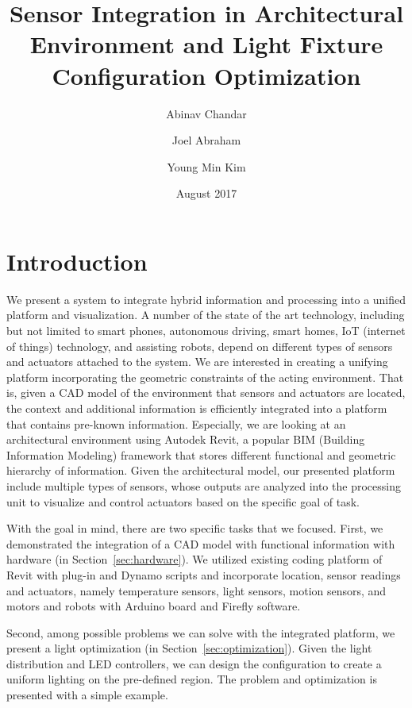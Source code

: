 \documentclass[a4paper]{article}
\title{Sensor Integration in Architectural Environment and Light Fixture Configuration Optimization}
\author{Abinav Chandar \and Joel Abraham \and Young Min Kim}
\date{August 2017}
\begin{document}
 \twocolumn
\maketitle
\section{Introduction}

We present a system to integrate hybrid information and processing into a unified platform and visualization.
A number of the state of the art technology, including but not limited to smart phones, autonomous driving, smart homes, IoT (internet of things) technology, and assisting robots, depend on different types of sensors and actuators attached to the system.
We are interested in creating a unifying platform incorporating the geometric constraints of the acting environment.
That is, given a CAD model of the environment that sensors and actuators are located, the context and additional information is efficiently integrated into a platform that contains pre-known information.
Especially, we are looking at an architectural environment using Autodek Revit, a popular BIM (Building Information Modeling) framework that stores different functional and geometric hierarchy of information.
Given the architectural model, our presented platform include multiple types of sensors, whose outputs are analyzed into the processing unit to visualize and control actuators based on the specific goal of task.

With the goal in mind, there are two specific tasks that we focused.
First, we demonstrated the integration of a CAD model with functional information with hardware (in Section~\ref{sec:hardware}).
We utilized existing coding platform of Revit with plug-in and Dynamo scripts and incorporate location, sensor readings and actuators, namely temperature sensors, light sensors, motion sensors, and motors and robots with Arduino board and Firefly software.

Second, among possible problems we can solve with the integrated platform, we present a light optimization (in Section~\ref{sec:optimization}).
Given the light distribution and LED controllers, we can design the configuration to create a uniform lighting on the pre-defined region.
The problem and optimization is presented with a simple example.


\end{document}
